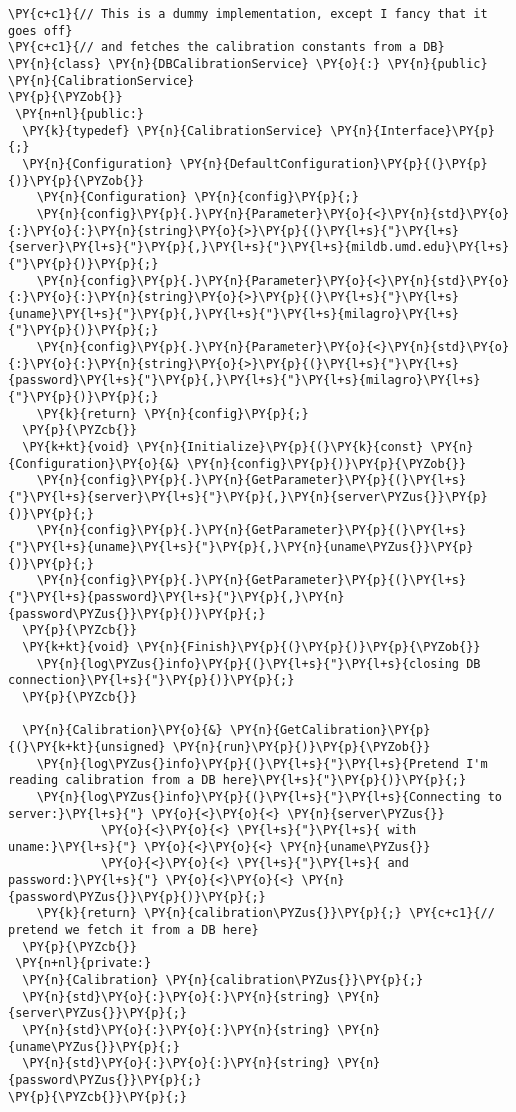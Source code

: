 \begin{Verbatim}[commandchars=\\\{\}]
\PY{c+c1}{// This is a dummy implementation, except I fancy that it goes off}
\PY{c+c1}{// and fetches the calibration constants from a DB}
\PY{n}{class} \PY{n}{DBCalibrationService} \PY{o}{:} \PY{n}{public} \PY{n}{CalibrationService}
\PY{p}{\PYZob{}}
 \PY{n+nl}{public:}
  \PY{k}{typedef} \PY{n}{CalibrationService} \PY{n}{Interface}\PY{p}{;}
  \PY{n}{Configuration} \PY{n}{DefaultConfiguration}\PY{p}{(}\PY{p}{)}\PY{p}{\PYZob{}}
    \PY{n}{Configuration} \PY{n}{config}\PY{p}{;}
    \PY{n}{config}\PY{p}{.}\PY{n}{Parameter}\PY{o}{<}\PY{n}{std}\PY{o}{:}\PY{o}{:}\PY{n}{string}\PY{o}{>}\PY{p}{(}\PY{l+s}{"}\PY{l+s}{server}\PY{l+s}{"}\PY{p}{,}\PY{l+s}{"}\PY{l+s}{mildb.umd.edu}\PY{l+s}{"}\PY{p}{)}\PY{p}{;}
    \PY{n}{config}\PY{p}{.}\PY{n}{Parameter}\PY{o}{<}\PY{n}{std}\PY{o}{:}\PY{o}{:}\PY{n}{string}\PY{o}{>}\PY{p}{(}\PY{l+s}{"}\PY{l+s}{uname}\PY{l+s}{"}\PY{p}{,}\PY{l+s}{"}\PY{l+s}{milagro}\PY{l+s}{"}\PY{p}{)}\PY{p}{;}
    \PY{n}{config}\PY{p}{.}\PY{n}{Parameter}\PY{o}{<}\PY{n}{std}\PY{o}{:}\PY{o}{:}\PY{n}{string}\PY{o}{>}\PY{p}{(}\PY{l+s}{"}\PY{l+s}{password}\PY{l+s}{"}\PY{p}{,}\PY{l+s}{"}\PY{l+s}{milagro}\PY{l+s}{"}\PY{p}{)}\PY{p}{;}
    \PY{k}{return} \PY{n}{config}\PY{p}{;}
  \PY{p}{\PYZcb{}}
  \PY{k+kt}{void} \PY{n}{Initialize}\PY{p}{(}\PY{k}{const} \PY{n}{Configuration}\PY{o}{&} \PY{n}{config}\PY{p}{)}\PY{p}{\PYZob{}}
    \PY{n}{config}\PY{p}{.}\PY{n}{GetParameter}\PY{p}{(}\PY{l+s}{"}\PY{l+s}{server}\PY{l+s}{"}\PY{p}{,}\PY{n}{server\PYZus{}}\PY{p}{)}\PY{p}{;}
    \PY{n}{config}\PY{p}{.}\PY{n}{GetParameter}\PY{p}{(}\PY{l+s}{"}\PY{l+s}{uname}\PY{l+s}{"}\PY{p}{,}\PY{n}{uname\PYZus{}}\PY{p}{)}\PY{p}{;}
    \PY{n}{config}\PY{p}{.}\PY{n}{GetParameter}\PY{p}{(}\PY{l+s}{"}\PY{l+s}{password}\PY{l+s}{"}\PY{p}{,}\PY{n}{password\PYZus{}}\PY{p}{)}\PY{p}{;}
  \PY{p}{\PYZcb{}}
  \PY{k+kt}{void} \PY{n}{Finish}\PY{p}{(}\PY{p}{)}\PY{p}{\PYZob{}}
    \PY{n}{log\PYZus{}info}\PY{p}{(}\PY{l+s}{"}\PY{l+s}{closing DB connection}\PY{l+s}{"}\PY{p}{)}\PY{p}{;}
  \PY{p}{\PYZcb{}}

  \PY{n}{Calibration}\PY{o}{&} \PY{n}{GetCalibration}\PY{p}{(}\PY{k+kt}{unsigned} \PY{n}{run}\PY{p}{)}\PY{p}{\PYZob{}}
    \PY{n}{log\PYZus{}info}\PY{p}{(}\PY{l+s}{"}\PY{l+s}{Pretend I'm reading calibration from a DB here}\PY{l+s}{"}\PY{p}{)}\PY{p}{;}
    \PY{n}{log\PYZus{}info}\PY{p}{(}\PY{l+s}{"}\PY{l+s}{Connecting to server:}\PY{l+s}{"} \PY{o}{<}\PY{o}{<} \PY{n}{server\PYZus{}}
             \PY{o}{<}\PY{o}{<} \PY{l+s}{"}\PY{l+s}{ with uname:}\PY{l+s}{"} \PY{o}{<}\PY{o}{<} \PY{n}{uname\PYZus{}}
             \PY{o}{<}\PY{o}{<} \PY{l+s}{"}\PY{l+s}{ and password:}\PY{l+s}{"} \PY{o}{<}\PY{o}{<} \PY{n}{password\PYZus{}}\PY{p}{)}\PY{p}{;}
    \PY{k}{return} \PY{n}{calibration\PYZus{}}\PY{p}{;} \PY{c+c1}{// pretend we fetch it from a DB here}
  \PY{p}{\PYZcb{}}
 \PY{n+nl}{private:}
  \PY{n}{Calibration} \PY{n}{calibration\PYZus{}}\PY{p}{;}
  \PY{n}{std}\PY{o}{:}\PY{o}{:}\PY{n}{string} \PY{n}{server\PYZus{}}\PY{p}{;}
  \PY{n}{std}\PY{o}{:}\PY{o}{:}\PY{n}{string} \PY{n}{uname\PYZus{}}\PY{p}{;}
  \PY{n}{std}\PY{o}{:}\PY{o}{:}\PY{n}{string} \PY{n}{password\PYZus{}}\PY{p}{;}
\PY{p}{\PYZcb{}}\PY{p}{;}


\end{Verbatim}
